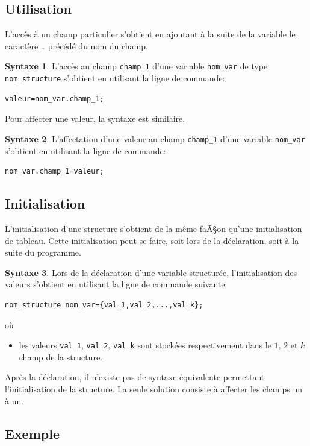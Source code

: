 \documentclass[a4paper,11pt]{book}
\theoremstyle{definition}
\newtheorem*{syntaxe}{Syntaxe}
\begin{document}
\subsection{Utilisation}
L'accès à un champ particulier s'obtient
en ajoutant à la suite de la variable le caractère \texttt{.} précédé du nom du champ.
\begin{syntaxe}L'accès au champ \texttt{champ\_1} d'une variable \texttt{nom\_var} de type \texttt{nom\_structure} s'obtient en utilisant la ligne de commande:
\begin{lstlisting}
valeur=nom_var.champ_1;
\end{lstlisting}
\end{syntaxe}
Pour affecter une valeur, la syntaxe est similaire.
\begin{syntaxe}L'affectation d'une valeur au champ \texttt{champ\_1} d'une variable \texttt{nom\_var} s'obtient en utilisant la ligne de commande:
\begin{lstlisting}
nom_var.champ_1=valeur;
\end{lstlisting}
\end{syntaxe}

\subsection{Initialisation}
L'initialisation d'une structure s'obtient de la même faÃ§on qu'une
initialisation de tableau. Cette initialisation peut se faire,
soit lors de la déclaration, soit à la suite du programme.
\begin{syntaxe}Lors de la déclaration d'une variable structurée, l'initialisation des valeurs s'obtient en utilisant la ligne de commande suivante:
\begin{lstlisting}
nom_structure nom_var={val_1,val_2,...,val_k};
\end{lstlisting}
où
\begin{itemize}
\item les valeurs \texttt{val\_1}, \texttt{val\_2}, \texttt{val\_k} sont stockées respectivement dans le $1$\ier{}, $2$\ieme{} et $k$\ieme{} champ de la structure.
\end{itemize}
\end{syntaxe}
Après la déclaration, il n'existe pas de syntaxe équivalente permettant l'initialisation de la structure. La seule solution consiste à affecter les champs un à un.

\subsection{Exemple}
\end{document}
